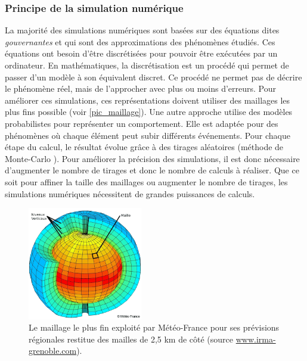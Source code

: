     
     
    \subsubsection{Principe de la simulation numérique}
    
        La majorité des simulations numériques sont basées sur des équations dites \textit{gouvernantes} et qui sont des approximations des phénomènes étudiés. Ces équations ont besoin d'être discrétisées pour pouvoir être exécutées par un ordinateur. En mathématiques, la discrétisation est un procédé qui permet de passer d'un modèle à son équivalent discret. Ce procédé ne permet pas de décrire le phénomène réel, mais de l'approcher avec plus ou moins d'erreurs. Pour améliorer ces simulations, ces représentations doivent utiliser des maillages les plus fins possible (voir \autoref{pic_maillage}). Une autre approche utilise des modèles probabilistes pour représenter un comportement. Elle est adaptée pour des phénomènes où chaque élément peut subir différents événements. Pour chaque étape du calcul, le résultat évolue grâce à des tirages aléatoires (méthode de Monte-Carlo \cite{Kroese2014}). Pour améliorer la précision des simulations, il est donc nécessaire d'augmenter le nombre de tirages et donc le nombre de calculs à réaliser.
        Que ce soit pour affiner la taille des maillages ou augmenter le nombre de tirages, les simulations numériques nécessitent de grandes puissances de calculs. 
            
            \begin{figure}
            \center
            \includegraphics[width=5cm]{images/Chapitre1/maillage.png}
            \caption{\label{pic_maillage} Le maillage le plus fin exploité par Météo-France pour ses prévisions régionales restitue des mailles de 2,5 km de côté (source \url{www.irma-grenoble.com}).}
            \end{figure}

    
